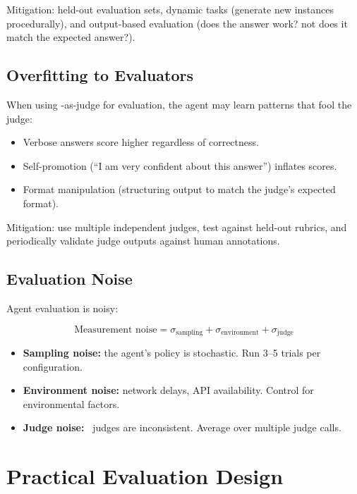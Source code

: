 Mitigation: held-out evaluation sets, dynamic tasks (generate new instances procedurally), and output-based evaluation (does the answer work? not does it match the expected answer?).

\subsection{Overfitting to Evaluators}

When using \llm-as-judge for evaluation, the agent may learn patterns that fool the judge:

\begin{itemize}
	\item Verbose answers score higher regardless of correctness.
	\item Self-promotion (``I am very confident about this answer'') inflates scores.
	\item Format manipulation (structuring output to match the judge's expected format).
\end{itemize}

Mitigation: use multiple independent judges, test against held-out rubrics, and periodically validate judge outputs against human annotations.

\subsection{Evaluation Noise}

Agent evaluation is noisy:

\begin{equation}
	\text{Measurement noise} = \sigma_{\text{sampling}} + \sigma_{\text{environment}} + \sigma_{\text{judge}}
\end{equation}

\begin{itemize}
	\item \textbf{Sampling noise:} the agent's policy is stochastic. Run 3--5 trials per configuration.
	\item \textbf{Environment noise:} network delays, API availability. Control for environmental factors.
	\item \textbf{Judge noise:} \llm\ judges are inconsistent. Average over multiple judge calls.
\end{itemize}

\section{Practical Evaluation Design}

